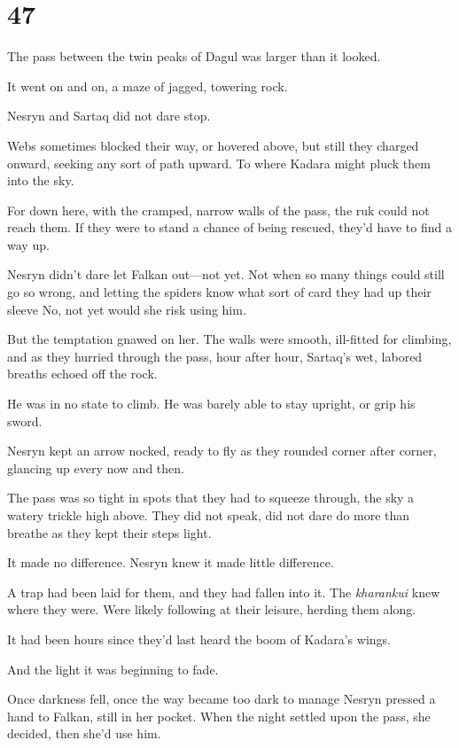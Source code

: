 
\chapter{47}

The pass between the twin peaks of Dagul was larger than it looked.

It went on and on, a maze of jagged, towering rock.

Nesryn and Sartaq did not dare stop.

Webs sometimes blocked their way, or hovered above, but still they charged onward, seeking any sort of path upward. To where Kadara might pluck them into the sky.

For down here, with the cramped, narrow walls of the pass, the ruk could not reach them. If they were to stand a chance of being rescued, they'd have to find a way up.

Nesryn didn't dare let Falkan out---not yet. Not when so many things could still go so wrong, and letting the spiders know what sort of card they had up their sleeve  No, not yet would she risk using him.

But the temptation gnawed on her. The walls were smooth, ill-fitted for climbing, and as they hurried through the pass, hour after hour, Sartaq's wet, labored breaths echoed off the rock.

He was in no state to climb. He was barely able to stay upright, or grip his sword.

Nesryn kept an arrow nocked, ready to fly as they rounded corner after corner, glancing up every now and then.

The pass was so tight in spots that they had to squeeze through, the sky a watery trickle high above. They did not speak, did not dare do more than breathe as they kept their steps light.

It made no difference. Nesryn knew it made little difference.

A trap had been laid for them, and they had fallen into it. The
\emph{kharankui} knew where they were. Were likely following at their leisure, herding them along.

It had been hours since they'd last heard the boom of Kadara's wings.

And the light  it was beginning to fade.

Once darkness fell, once the way became too dark to manage 
Nesryn pressed a hand to Falkan, still in her pocket. When the night settled upon the pass, she decided, then she'd use him.


